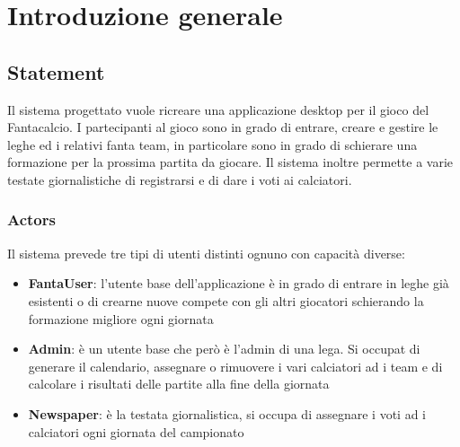 \section{Introduzione generale}

\subsection{Statement}
Il sistema progettato vuole ricreare una applicazione desktop per il gioco del
Fantacalcio. I partecipanti al gioco sono in grado di entrare, creare e gestire le leghe ed i 
relativi fanta team, in particolare sono in grado di schierare una formazione per la prossima partita
da giocare. Il sistema inoltre permette a varie testate giornalistiche di registrarsi e di dare i voti ai 
calciatori.
\subsubsection{Actors}
Il sistema prevede tre tipi di utenti distinti ognuno con capacità diverse:
\begin{itemize}
    \item \textbf{FantaUser}: l'utente base dell'applicazione è in grado di entrare in leghe già esistenti o di crearne nuove
    compete con gli altri giocatori schierando la formazione migliore ogni giornata
    \item \textbf{Admin}: è un utente base che però è l'admin di una lega. Si occupat di generare il calendario,  
    assegnare o rimuovere i vari calciatori ad i team e di calcolare i risultati delle partite alla fine della giornata
    \item \textbf{Newspaper}: è la testata giornalistica, si occupa di assegnare i voti ad i calciatori ogni giornata del campionato
\end{itemize}